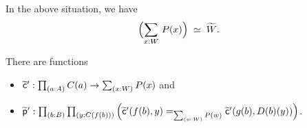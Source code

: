 \documentclass[hott-all.tex]{subfiles}
\begin{document}
% 
% 
\begin{lem}
  In the above situation, we have
  \[ \eqvspaced{\Parens{\sm{x:W} P(x)}}{\widetilde{W}}. \]
\end{lem}
% 
% 
% 
% 
\begin{lem}
  There are functions
  \begin{itemize}
  \item $\cct':\prd{a:A} C(a) \to \sm{x:W} P(x)$ and
  \item $\ppt':\prd{b:B}{y:C(f(b))} \Big(\cct'(f(b),y)=_{\sm{w:W}P(w)}\cct'(g(b),D(b)(y))\Big)$.
  \end{itemize}
\end{lem}
\end{document}
